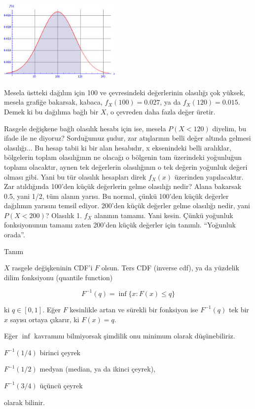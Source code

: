 \documentclass[12pt,fleqn]{article}\usepackage{../../common}
\begin{document}
\includegraphics[height=4cm]{stat_intro_10.png}

Mesela üstteki dağılım için 100 ve çevresindeki değerlerinin olasılığı çok
yüksek, mesela grafiğe bakarsak, kabaca, $f_X(100) = 0.027$, ya da
$f_X(120) = 0.015$.  Demek ki bu dağılıma bağlı bir $X$, o çevreden daha
fazla değer üretir.

Rasgele değişkene bağlı olasılık hesabı için ise, mesela $P(X < 120)$
diyelim, bu ifade ile ne diyoruz? Sorduğumuz şudur, zar atışlarının belli
değer altında gelmesi olasılığı... Bu hesap tabii ki bir alan hesabıdır, x
eksenindeki belli aralıklar, bölgelerin toplam olasılığının ne olacağı o
bölgenin tam üzerindeki yoğunluğun toplamı olacaktır, aynen tek
değerlerin olasılığının o tek değerin yoğunluk değeri olması gibi. Yani
bu tür olasılık hesapları direk $f_X(x)$ üzerinden yapılacaktır. Zar
atıldığında 100'den küçük değerlerin gelme olasılığı nedir? Alana bakarsak
0.5, yani 1/2, tüm alanın yarısı. Bu normal, çünkü 100'den küçük değerler
dağılımın yarısını temsil ediyor. 200'den küçük değerler gelme olasılığı
nedir, yani $P(X < 200)$? Olasılık 1. $f_X$ alanının tamamı. Yani
kesin. Çünkü yoğunluk fonksiyonunun tamamı zaten 200'den küçük değerler
için tanımlı. ``Yoğunluk orada''.

Tanım

$X$ rasgele değişkeninin CDF'i $F$ olsun. Ters CDF (inverse cdf), ya da yüzdelik
dilim fonksiyonu (quantile function)

$$ F^{-1}(q) = \inf \bigg\{ x: F(x) \le q \bigg\} $$

ki $q \in [0,1]$. Eğer $F$ kesinlikle artan ve sürekli bir fonksiyon ise
$F^{-1}(q)$ tek bir $x$ sayısı ortaya çıkarır, ki $F(x) = q$. 

Eğer $\inf$ kavramını bilmiyorsak şimdilik onu minimum olarak düşünebiliriz. 

$F^{-1}(1/4)$ birinci çeyrek

$F^{-1}(1/2)$ medyan (median, ya da ikinci çeyrek), 

$F^{-1}(3/4)$ üçüncü çeyrek 

olarak bilinir. 
\end{document}
